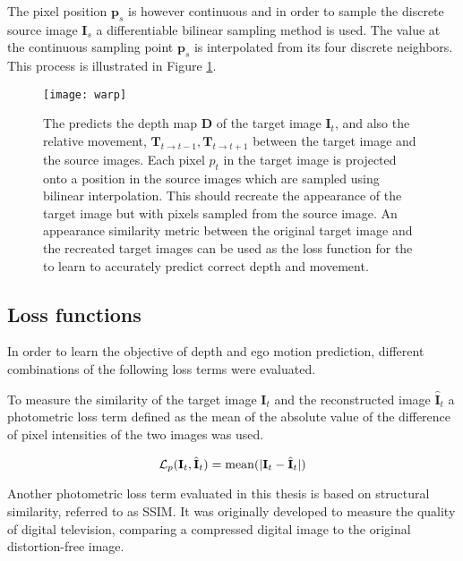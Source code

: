 The pixel position $ \textbf{p}_s $ is however continuous and in order to sample the discrete source image $ \textbf{I}_s $ a differentiable bilinear sampling method is used\cite{spatialtransformernetworks}. The value at the continuous sampling point $\textbf{p}_s$ is interpolated from its four discrete neighbors. This process is illustrated in Figure \ref{fig:warp}.


\begin{figure}[H]
	\centering
	\texttt{[image: warp]}
	\caption{The \abbrCNN predicts the depth map $\textbf{D}$ of the target image $\textbf{I}_t$, and also the relative movement, $\textbf{T}_{t\rightarrow t-1}, \textbf{T}_{t\rightarrow t+1}$ between the target image and the source images. Each pixel $p_t$ in the target image is projected onto a position in the source images which are sampled using bilinear interpolation. This should recreate the appearance of the target image but with pixels sampled from the source image. An appearance similarity metric between the original target image and the recreated target images can be used as the loss function for the \abbrCNN to learn to accurately predict correct depth and movement.}
	\label{fig:warp}
\end{figure}



\subsection{Loss functions}
\label{sec:loss}

In order to learn the objective of depth and ego motion prediction, different combinations of the following loss terms were evaluated.

To measure the similarity of the target image $\textbf{I}_t$ and the reconstructed image $\hat{\textbf{I}}_t$ a photometric loss term defined as the mean of the absolute value of the difference of pixel intensities of the two images was used.

\begin{equation}
\mathcal{L}_p(\textbf{I}_t, \hat{\textbf{I}}_t)=\operatorname{mean}(|\textbf{I}_t - \hat{\textbf{I}}_t|)
\end{equation}

Another photometric loss term evaluated in this thesis is based on structural similarity, referred to as SSIM\cite{ssim}. It was originally developed to measure the quality of digital television, comparing a compressed digital image to the original distortion-free image.

